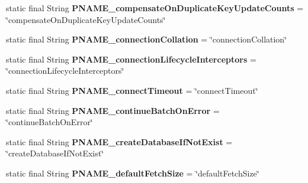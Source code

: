 \begin{DoxyCompactItemize}
static final String {\bfseries P\+N\+A\+M\+E\+\_\+compensate\+On\+Duplicate\+Key\+Update\+Counts} = \char`\"{}compensate\+On\+Duplicate\+Key\+Update\+Counts\char`\"{}
\item 
\mbox{\label{classcom_1_1mysql_1_1cj_1_1conf_1_1_property_definitions_a49a22e61af822db16f5b864d2095fe59}} 
static final String {\bfseries P\+N\+A\+M\+E\+\_\+connection\+Collation} = \char`\"{}connection\+Collation\char`\"{}
\item 
\mbox{\label{classcom_1_1mysql_1_1cj_1_1conf_1_1_property_definitions_ac11f0bfa305a24e52187164386493e89}} 
static final String {\bfseries P\+N\+A\+M\+E\+\_\+connection\+Lifecycle\+Interceptors} = \char`\"{}connection\+Lifecycle\+Interceptors\char`\"{}
\item 
\mbox{\label{classcom_1_1mysql_1_1cj_1_1conf_1_1_property_definitions_a43cf3b18674e312a133f46f084989700}} 
static final String {\bfseries P\+N\+A\+M\+E\+\_\+connect\+Timeout} = \char`\"{}connect\+Timeout\char`\"{}
\item 
\mbox{\label{classcom_1_1mysql_1_1cj_1_1conf_1_1_property_definitions_acc6fa852d2423f323954e5d5b305dd6b}} 
static final String {\bfseries P\+N\+A\+M\+E\+\_\+continue\+Batch\+On\+Error} = \char`\"{}continue\+Batch\+On\+Error\char`\"{}
\item 
\mbox{\label{classcom_1_1mysql_1_1cj_1_1conf_1_1_property_definitions_abd2f85651b9c1a0e465d4d3f581d12d8}} 
static final String {\bfseries P\+N\+A\+M\+E\+\_\+create\+Database\+If\+Not\+Exist} = \char`\"{}create\+Database\+If\+Not\+Exist\char`\"{}
\item 
\mbox{\label{classcom_1_1mysql_1_1cj_1_1conf_1_1_property_definitions_ab3e6d7f782af8348e1e3106fddb8c891}} 
static final String {\bfseries P\+N\+A\+M\+E\+\_\+default\+Fetch\+Size} = \char`\"{}default\+Fetch\+Size\char`\"{}
\item 
\mbox{\label{classcom_1_1mysql_1_1cj_1_1conf_1_1_property_definitions_aec2d952edb995ad29455af0db809936d}} 

\end{DoxyCompactItemize}
